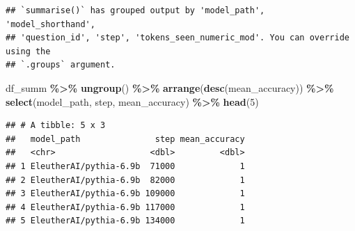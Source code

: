 \documentclass[
]{article}
\newenvironment{Shaded}{\begin{snugshade}}{\end{snugshade}}
\newcommand{\DecValTok}[1]{\textcolor[rgb]{0.00,0.00,0.81}{#1}}
\newcommand{\FunctionTok}[1]{\textcolor[rgb]{0.13,0.29,0.53}{\textbf{#1}}}
\newcommand{\NormalTok}[1]{#1}
\newcommand{\SpecialCharTok}[1]{\textcolor[rgb]{0.81,0.36,0.00}{\textbf{#1}}}
\begin{document}
\begin{verbatim}
## `summarise()` has grouped output by 'model_path', 'model_shorthand',
## 'question_id', 'step', 'tokens_seen_numeric_mod'. You can override using the
## `.groups` argument.
\end{verbatim}

\begin{Shaded}
\begin{Highlighting}[]
\NormalTok{df\_summ }\SpecialCharTok{\%\textgreater{}\%}
  \FunctionTok{ungroup}\NormalTok{() }\SpecialCharTok{\%\textgreater{}\%}
  \FunctionTok{arrange}\NormalTok{(}\FunctionTok{desc}\NormalTok{(mean\_accuracy)) }\SpecialCharTok{\%\textgreater{}\%}
  \FunctionTok{select}\NormalTok{(model\_path, step, mean\_accuracy) }\SpecialCharTok{\%\textgreater{}\%}
  \FunctionTok{head}\NormalTok{(}\DecValTok{5}\NormalTok{)}
\end{Highlighting}
\end{Shaded}

\begin{verbatim}
## # A tibble: 5 x 3
##   model_path               step mean_accuracy
##   <chr>                   <dbl>         <dbl>
## 1 EleutherAI/pythia-6.9b  71000             1
## 2 EleutherAI/pythia-6.9b  82000             1
## 3 EleutherAI/pythia-6.9b 109000             1
## 4 EleutherAI/pythia-6.9b 117000             1
## 5 EleutherAI/pythia-6.9b 134000             1
\end{verbatim}
\end{document}
